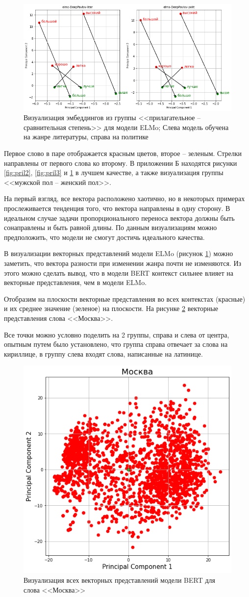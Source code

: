 \documentclass[a4paper,14pt]{article}
\begin{document}
\begin{figure}[H]
	\centering
	\includegraphics[width=0.5\linewidth]{image/elmo_pil}
	\caption{Визуализация эмбеддингов из группы <<прилагательное -- сравнительная степень>> для модели ELMo; Слева модель обучена на жанре литературы, справа на политике}
	\label{fig:elmopil}
\end{figure}

Первое слово в паре отображается красным цветов, второе -- зеленым.
Стрелки направлены от первого слова ко второму.
В приложении Б находятся рисунки \ref{fig:pril2}, \ref{fig:pril3} и \ref{fig:elmopil} в лучшем качестве, а также визуализация группы <<мужской пол -- женский пол>>.
 
На первый взгляд, все вектора расположено хаотично, но в некоторых примерах прослеживается тенденция того, что вектора направлены в одну сторону.
В идеальном случае задачи пропорционального переноса вектора должны быть сонаправлены и быть равной длины.
По данным визуализациям можно предположить, что модели не смогут достичь идеального качества.

В визуализации векторных представлений модели ELMo (рисунок \ref{fig:elmopil}) можно заметить, что вектора разности при изменении жанра почти не изменяются.
Из этого можно сделать вывод, что в модели BERT контекст сильнее влияет на векторные представления, чем в модели ELMo.

Отобразим на плоскости векторные представления во всех контекстах (красные) и их среднее значение (зеленое) на плоскости.
На рисунке \ref{fig:moscow} векторные представления слова <<Москва>>.

Все точки можно условно поделить на 2 группы, справа и слева от центра, опытным путем было установлено, что группа справа отвечает за слова на кириллице, в группу слева входят слова, написанные на латинице. 

\begin{figure}[H]
	\centering
	\includegraphics[width=0.5\linewidth]{image/moscow}
	\caption{Визуализация всех векторных представлений модели BERT для слова <<Москва>>}
	\label{fig:moscow}
\end{figure}
\end{document}
